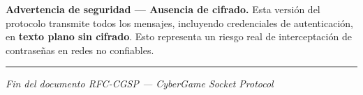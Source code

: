 \documentclass[12pt, letterpaper]{article}
\begin{document}
\begin{advertencia}
\textbf{Advertencia de seguridad --- Ausencia de cifrado.}
Esta versión del protocolo transmite todos los mensajes, incluyendo credenciales de
autenticación, en \textbf{texto plano sin cifrado}. Esto representa un riesgo real
de interceptación de contraseñas en redes no confiables.
\end{advertencia}

\vspace{2cm}
\hrule
\vspace{0.3cm}
{\small\centering\textit{Fin del documento RFC-CGSP --- CyberGame Socket Protocol}\par}
\end{document}
